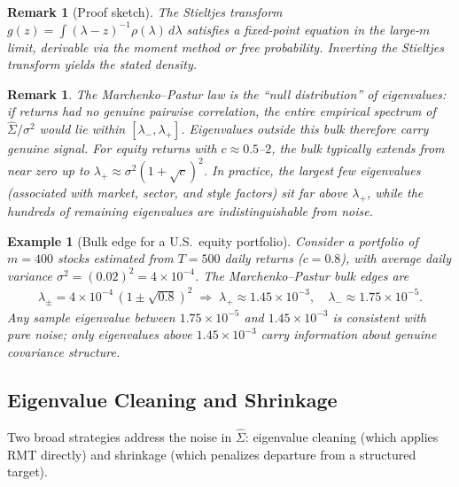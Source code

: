 \documentclass{report}
\theoremstyle{spacedplain}
\theoremstyle{spaceddefinition}
\newtheorem{example}[theorem]{Example}
\theoremstyle{spacedremark}
\newtheorem{remark}[theorem]{Remark}
\begin{document}
\begin{remark}[Proof sketch]
The Stieltjes transform $g(z) = \int(\lambda - z)^{-1}\rho(\lambda)\,d\lambda$ satisfies a fixed-point equation in the large-$m$ limit, derivable via the moment method or free probability. Inverting the Stieltjes transform yields the stated density.
\end{remark}
 
\begin{remark}
The Marchenko--Pastur law is the ``null distribution'' of eigenvalues: if returns had no genuine pairwise correlation, the entire empirical spectrum of $\hat{\Sigma}/\sigma^2$ would lie within $[\lambda_-,\lambda_+]$. Eigenvalues
outside this bulk therefore carry genuine signal. For equity returns with $c \approx 0.5$--$2$, the bulk typically extends from near zero up to $\lambda_+ \approx \sigma^2(1+\sqrt{c})^2$. In practice, the largest few
eigenvalues (associated with market, sector, and style factors) sit far above $\lambda_+$, while the hundreds of remaining eigenvalues are indistinguishable
from noise.
\end{remark}
 
\begin{example}[Bulk edge for a U.S.\ equity portfolio]
Consider a portfolio of $m = 400$ stocks estimated from $T = 500$ daily returns ($c = 0.8$), with average daily variance $\sigma^2 = (0.02)^2 = 4\times 10^{-4}$. The Marchenko--Pastur bulk edges are
\begin{align}
    \lambda_\pm = 4\times10^{-4}\,(1 \pm \sqrt{0.8})^2
    \;\Rightarrow\;
    \lambda_+ \approx 1.45\times10^{-3},\quad
    \lambda_- \approx 1.75\times10^{-5}.
\end{align}
Any sample eigenvalue between $1.75\times10^{-5}$ and $1.45\times10^{-3}$ is consistent with pure noise; only eigenvalues above $1.45\times10^{-3}$ carry information about genuine covariance structure.
\end{example}
 
\subsection{Eigenvalue Cleaning and Shrinkage}
 
Two broad strategies address the noise in $\hat{\Sigma}$: eigenvalue cleaning (which applies RMT directly) and shrinkage (which penalizes departure from a structured target).
 
\end{document}
